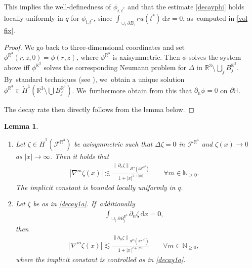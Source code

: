 \documentclass[JEP,XML,SOM,Unicode,published]{cedram}
\let\backslash\setminus
\newtheorem{lemma}[theorem]{Lemma}
\theoremstyle{definition}
\newcommand\R{\mathbb{R}}
\newcommand\N{\mathbb{N}}
\newcommand\norm[1]{\left\lVert #1\right\rVert}
\newcommand\eq{=}
\newcommand\dd{\,\mathrm{d}}
\newcommand\dx{\dd x}
\let\de\partial
\begin{document}
This implies the well-definedness of $\phi_{i,t^*}$ and that the estimate \eqref{decayphi} holds locally uniformly in $q$ for $\phi_{i,t^*}$, since $\int_{\cup_i\de B_i} ru(t^*)\dx=0$, as~computed in \eqref{vol fix}.

\begin{proof}
We go back to three-dimensional coordinates and set $\phi^{\R^3}(r,z,0)=\phi(r,z)$, where $\phi^{\R^3}$ is axisymmetric. Then $\phi$ solves the system above iff $\phi^{\R^3}$ solves the corresponding Neumann problem for $\Delta$ in $\R^3\backslash \bigcup_j B_j^{\R^3}$. By~standard techniques (see \eg \cite{Amrouche}), we~obtain a unique solution $\phi^{\R^3}\in \dot{H}^{1}(\R^3\backslash \bigcup B_j^{\R^3})$. We~furthermore obtain from this that $\de_n\phi=0$ on $\de\mathbb{H}$.

The decay rate then directly follows from the lemma below.
\end{proof}

\skpt
\begin{lemma}\label{decay1}
\begin{enumerate}
\item\label{decay1a}
Let $\zeta\in \dot{H}^1(\mathcal{F}^{\R^3})$ be axisymmetric such that $\Delta\zeta=0$ in $\mathcal{F}^{\R^3}$ and $\zeta(x)\to 0$ as $|x|\to\infty$. Then it holds that
\begin{align*}
\left|\nabla^m\zeta(x)\right|\lesssim \frac{\norm{\de_n\zeta}_{H^{m}(\de\mathcal{F}^{\R^3})}}{1+|x|^{1+|m|}}\qquad \forall m\in\N_{\geq 0}.
\end{align*}
The implicit constant is bounded locally uniformly in $q$.

\item\label{decay1b}
 Let $\zeta$ be as in \eqref{decay1a}. If~additionally
\begin{align*}
\int_{\cup_j \de B_j^{\R^3}}\de_n\zeta\dx\eq0,
\end{align*}
then
\begin{align*}
\left|\nabla^m\zeta(x)\right|\lesssim \frac{\norm{\de_n\zeta}_{H^{m}(\de\mathcal{F}^{\R^3})}}{1+|x|^{2+|m|}}\qquad \forall m\in\N_{\geq 0},
\end{align*}
where the implicit constant is controlled as in \eqref{decay1a}.
\end{enumerate}
\end{lemma}
\end{document}
